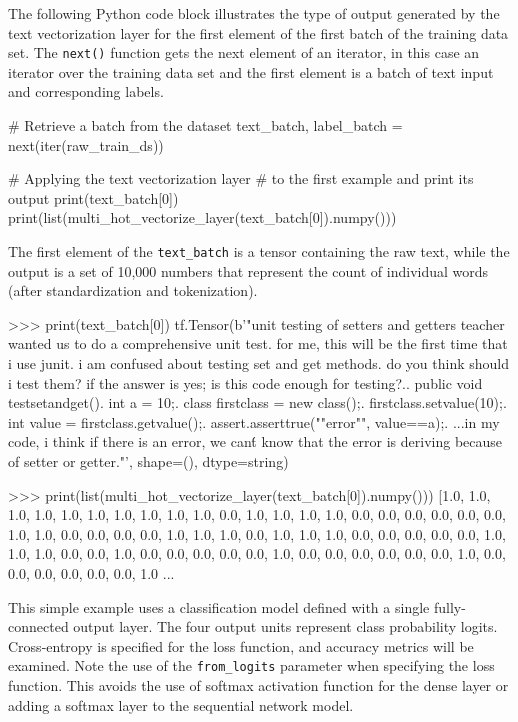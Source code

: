 The following Python code block illustrates the type of output generated by the text vectorization layer for the first element of the first batch of the training data set. The \texttt{next()} function gets the next element of an iterator, in this case an iterator over the training data set and the first element is a batch of text input and corresponding labels.

\begin{samepage}
\begin{pythoncode}
# Retrieve a batch from the dataset
text_batch, label_batch = next(iter(raw_train_ds))

# Applying the text vectorization layer
# to the first example and print its output
print(text_batch[0])
print(list(multi_hot_vectorize_layer(text_batch[0]).numpy()))
\end{pythoncode}
\end{samepage}

The first element of the \texttt{text\_batch} is a tensor containing the raw text, while the output is a set of 10,000 numbers that represent the count of individual words (after standardization and tokenization).

\begin{samepage}
\begin{textcode}
>>> print(text_batch[0])
tf.Tensor(b'"unit testing of setters and getters teacher wanted us 
to do a comprehensive unit test. for me, this will be the first time 
that i use junit. i am confused about testing set and get methods. 
do you think should i test them? if the answer is yes; is this code 
enough for testing?..  public void testsetandget(){.    int a = 10;.    
class firstclass = new class();.    firstclass.setvalue(10);.    int
value = firstclass.getvalue();.    assert.asserttrue(""error"", 
value==a);.  }...in my code, i think if there is an error, we can\'t
know that the error is deriving because of setter or getter."\n', 
shape=(), dtype=string)

>>> print(list(multi_hot_vectorize_layer(text_batch[0]).numpy()))
[1.0, 1.0, 1.0, 1.0, 1.0, 1.0, 1.0, 1.0, 1.0, 1.0, 0.0, 1.0, 1.0, 
1.0, 1.0, 0.0, 0.0, 0.0, 0.0, 0.0, 0.0, 1.0, 1.0, 0.0, 0.0, 0.0, 
0.0, 1.0, 1.0, 1.0, 0.0, 1.0, 1.0, 1.0, 0.0, 0.0, 0.0, 0.0, 0.0, 
1.0, 1.0, 1.0, 0.0, 0.0, 1.0, 0.0, 0.0, 0.0, 0.0, 0.0, 1.0, 0.0, 
0.0, 0.0, 0.0, 0.0, 0.0, 1.0, 0.0, 0.0, 0.0, 0.0, 0.0, 0.0, 1.0
...
\end{textcode}
\end{samepage}

This simple example uses a classification model defined with a single fully-connected output layer. The four output units represent class probability logits. Cross-entropy is specified for the loss function, and accuracy metrics will be examined. Note the use of the \texttt{from\_logits} parameter when specifying the loss function. This avoids the use of softmax activation function for the dense layer or adding a softmax layer to the sequential network model.

